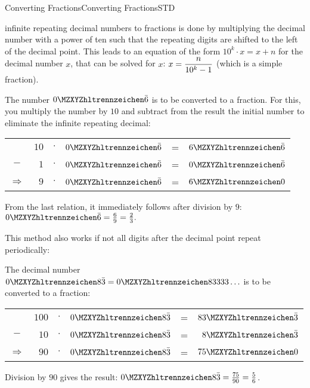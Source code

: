 \begin{MXContent}{Converting Fractions}{Converting Fractions}{STD}
\begin{MInfo}
 infinite repeating decimal numbers to fractions is 
done by multiplying the decimal number with a power of ten such that the repeating digits are shifted 
to the left of the decimal point. This leads to an equation of the form $10^k\cdot x=x+n$ for the decimal 
number $x$, that can be solved for $x$: $x=\dfrac{n}{10^k-1}$ (which is a simple fraction).
\end{MInfo}

\begin{MExample}
The number $\MZahl{0}{}\bar 6$ is to be converted to a fraction. For this, you multiply the number by 
$10$ and subtract from the result the initial number to eliminate the infinite repeating decimal:
\begin{center}
\begin{tabular}{crclcr}
	&$10$ & $\cdot$ & $\MZahl{0}{}\bar 6$ & = & $\MZahl{6}{}\bar 6$\\
	$-$ & $1$ & $\cdot$ & $\MZahl{0}{}\bar 6$ & = & $\MZahl{0}{}\bar 6$\\
\hline
$\Rightarrow$&$9$ & $\cdot$ & $\MZahl{0}{}\bar 6$ & = & $\MZahl{6}{0}$\\
\end{tabular}
\end{center}
From the last relation, it immediately follows after division by $9$:
\quad $\displaystyle \MZahl{0}{}\bar 6 = \Mtfrac{6}{9} = \Mtfrac{2}{3}.$
\end{MExample}

This method also works if not all digits after the decimal point repeat periodically:

\begin{MExample}
The decimal number $\MZahl{0}{8}\bar{3}=\MZahl{0}{83333}\ldots$ is to be converted to 
a fraction:
\begin{center}
\begin{tabular}{crclcr}
&$100$ & $\cdot$ & $\MZahl{0}{8}\bar 3$ & = & $\MZahl{83}{}\bar 3$\\
$-$&$10$ & $\cdot$ & $\MZahl{0}{8}\bar 3$ & = & $\MZahl{8}{}\bar 3$\\
\hline
$\Rightarrow$&$90$ & $\cdot$ & $\MZahl{0}{8}\bar 3$ & = & $\MZahl{75}{0}$\\
\end{tabular}
\end{center}
Division by $90$ gives the result: $\displaystyle \MZahl{0}{8}\bar 3 = \Mtfrac{75}{90} = \Mtfrac{5}{6}$.
\end{MExample}


\end{MXContent}
